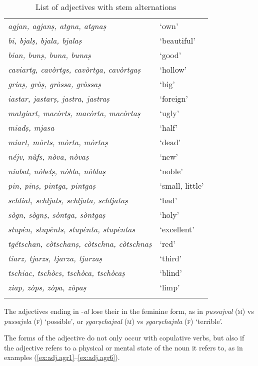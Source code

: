 \begin{table}
\caption{List of adjectives with stem alternations}
\label{tab:list:adj:stemalternations}
 \begin{tabular}{ll}
  \lsptoprule
\textit{agjan, agjanṣ, atgna, atgnaṣ} &`own'\\
\textit{bi, bjalṣ, bjala, bjalaṣ} &`beautiful'\\
\textit{bian, bunṣ, buna, bunaṣ} &  `good'\\
\textit{caviartg, cavòrtgs, cavòrtga, cavòrtgaṣ}& `hollow'\\
\textit{griaṣ, gròṣ, gròssa, gròssaṣ} &`big'\\
\textit{iastar, jastarṣ, jastra, jastraṣ}& `foreign'\\
\textit{matgiart, macòrts, macòrta, macòrtaṣ} &`ugly'\\
\textit{miadṣ, mjasa} & `half'\\
\textit{miart, mòrts, mòrta, mòrtaṣ} &`dead'\\
\textit{néjv, nùfs, nòva, nòvaṣ} &`new'\\
\textit{niabal, nòbelṣ, nòbla, nòblaṣ} & `noble'\\
\textit{pin, pinṣ, pintga, pintgaṣ} &`small, little’\\
\textit{schliat, schljats, schljata, schljataṣ}& `bad'\\ 
\textit{sògn, sògnṣ, sòntga, sòntgaṣ} &`holy'\\
\textit{stupèn, stupènts, stupènta, stupèntas} & `excellent'\\
\textit{tgétschan, còtschanṣ, còtschna, còtschnaṣ}& `red'\\
\textit{tiarz, tjarzs, tjarza, tjarzaṣ}&`third'\\
\textit{tschiac, tschòcs, tschòca, tschòcaṣ}&`blind'\\
\textit{ziap, zòps, zòpa, zòpaṣ} & `limp'\\
  \lspbottomrule
 \end{tabular}
\end{table}

The adjectives ending in -\textit{al} lose their  in the feminine form, as in \textit{pussajval} (\textsc{m}) vs \textit{pussajvla} (\textsc{f}) `possible', or \textit{ṣgarṣchajval} (\textsc{m}) vs \textit{ṣgarṣchajvla} (\textsc{f}) `terrible'.

The  forms of the adjective do not only occur with copulative verbs, but also if the adjective refers to a physical or mental state of the noun it refers to, as in examples (\ref{ex:adj.agr1}--\ref{ex:adj.agr6}).
 

